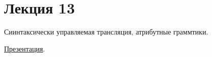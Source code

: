 \section{Лекция 13}
 
Сиинтаксически управляемая трансляция, атрибутные граммтики.

\href{https://github.com/YaccConstructor/articles/blob/master/InProgress/Formal_languages_course/attrib_grammars/presentation.pdf}{Презентация}.
